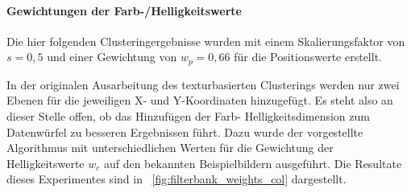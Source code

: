 \paragraph{Gewichtungen der Farb-/Helligkeitswerte}
Die hier folgenden Clusteringergebnisse wurden mit einem Skalierungsfaktor von $s=0,5$ und einer Gewichtung von $w_p=0,66$ für die Positionswerte erstellt.

In der originalen Ausarbeitung des texturbasierten Clusterings \cite{jain_91} werden nur zwei Ebenen für die jeweiligen X- und Y-Koordinaten hinzugefügt. Es steht also an dieser Stelle offen, ob das Hinzufügen der Farb- \bzw Helligkeitsdimension zum Datenwürfel zu besseren Ergebnissen führt. Dazu wurde der vorgestellte Algorithmus mit unterschiedlichen Werten für die Gewichtung der Helligkeitswerte $w_c$ auf den bekannten Beispielbildern ausgeführt. Die Resultate dieses Experimentes sind in \figurename~\ref{fig:filterbank_weights_col} dargestellt.

